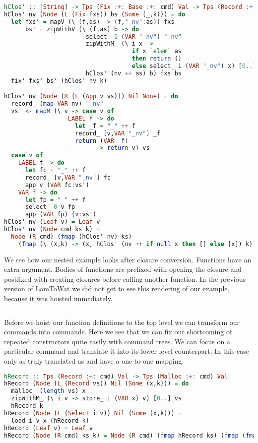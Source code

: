 \begin{lstlisting}[language=Haskell]
hClos' :: [String] -> Tps (Fix :+: Base :+: cmd) Val -> Tps (Record :+: Fix :+: Base :+: cmd) Val
hClos' nv (Node (L (Fix fxs)) bs (Some (_,k))) = do
  let fxs' = mapV (\ (f,as) -> (f,"_nv":as)) fxs
      bs' = zipWithV (\ (f,as) b -> do
                       select_ 1 (VAR "_nv") "_nv"
                       zipWithM_ (\ i x ->
                                    if x `elem` as
                                    then return ()
                                    else select_ i (VAR "_nv") x) [0..] nv
                       hClos' (nv ++ as) b) fxs bs
  fix' fxs' bs' (hClos' nv k)

hClos' nv (Node (R (L (App v vs))) Nil None) = do
  record_ (map VAR nv) "_nv"
  vs' <- mapM (\ v -> case v of
                  LABEL f -> do
                    let _f = "_" ++ f
                    record_ [v,VAR "_nv"] _f
                    return (VAR _f)
                  _       -> return v) vs
  case v of
    LABEL f -> do
      let fc = "_" ++ f
      record_ [v,VAR "_nv"] fc
      app v (VAR fc:vs')
    VAR f -> do
      let fp = "_" ++ f
      select_ 0 v fp
      app (VAR fp) (v:vs')
hClos' nv (Leaf v) = Leaf v
hClos' nv (Node cmd ks k) =
  Node (R cmd) (fmap (hClos' nv) ks)
    (fmap (\ (x,k) -> (x, hClos' (nv ++ if null x then [] else [x]) k)) k)
\end{lstlisting}

We see how our nested example  looks after closure conversion. Functions have an extra  argument. Bodies of functions are prefixed with opening the closure and postfixed with creating closures before calling another function. In the previous version of LamToWat we did not get to see this rendering of our example, because it was hoisted immediately.

\begin{lstlisting}[language=Python]
\end{lstlisting}

Before we hoist our function definitions to the top level we can transform our  commands into  commands. Here we see that we can fix our shortcoming of repeated constructors quite easily with command trees. We can focus on a particular command and translate it into its lower-level counterpart. In this case only  as truly translated as  and  have a one-to-one mapping.

\begin{lstlisting}[language=Haskell]
hRecord :: Tps (Record :+: cmd) Val -> Tps (Malloc :+: cmd) Val
hRecord (Node (L (Record vs)) Nil (Some (x,k))) = do
  malloc_ (length vs) x
  zipWithM_ (\ i v -> store_ i (VAR x) v) [0..] vs
  hRecord k
hRecord (Node (L (Select i v)) Nil (Some (x,k))) =
  load i v x (hRecord k)
hRecord (Leaf v) = Leaf v
hRecord (Node (R cmd) ks k) = Node (R cmd) (fmap hRecord ks) (fmap (fmap hRecord) k)
\end{lstlisting}

